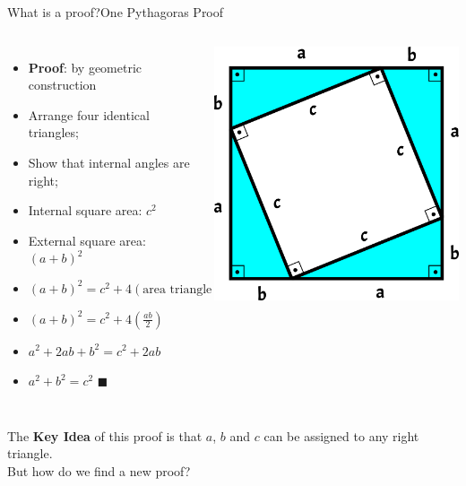 \begin{frame}{What is a proof?}{One Pythagoras Proof}

  \begin{columns}[T]
      \begin{itemize}
        \item {\bf Proof}: by geometric construction
        \item Arrange four identical triangles;
        \item Show that internal angles are right;
        \item Internal square area: $c^2$
        \item External square area: $(a+b)^2$
        \item $(a+b)^2 = c^2 + 4(\text{area triangle})$
        \item $(a+b)^2 = c^2 + 4(\frac{ab}{2})$
        \item $a^2 + 2ab + b^2 = c^2 + 2ab$
        \item $a^2 + b^2 = c^2$ \hfill $\blacksquare$
      \end{itemize}
      \includegraphics[width=\textwidth]{../img/triangle_pytagoras}
  \end{columns}
  \bigskip

  The {\bf Key Idea} of this proof is that $a$, $b$ and $c$ can be assigned to \alert{any right triangle}.\\
  But how do we find a new proof?
\end{frame}

